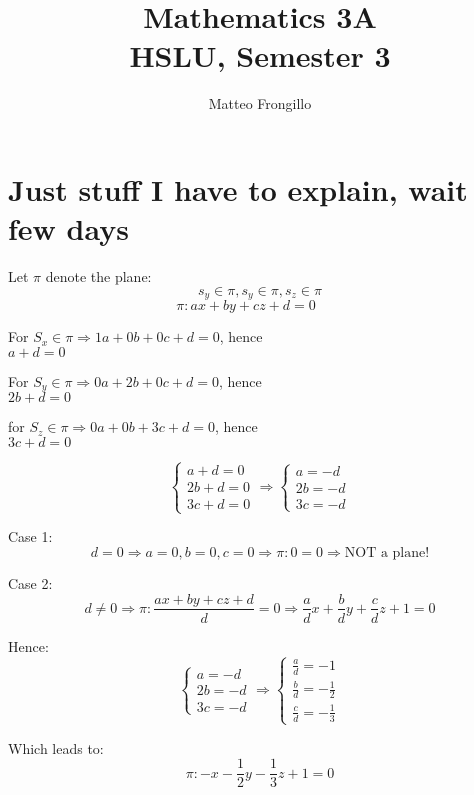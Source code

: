 \documentclass{article}
\title{\textbf{Mathematics 3A \\ HSLU, Semester 3}}
\author{Matteo Frongillo}
\date{}
\begin{document}
\maketitle
\tableofcontents
\pagebreak

\part{Just stuff I have to explain, wait few days}
Let $\pi$ denote the plane:
\[s_y\in \pi, s_y\in\pi, s_z\in\pi\]
\[\pi: ax+by+cz+d=0\qquad \]

For $S_x\in\pi \Longrightarrow 1a+0b+0c+d = 0$, hence\\
$a+d=0$

For $S_y\in\pi \Longrightarrow 0a+2b+0c+d=0$, hence\\
$2b+d=0$

for $S_z\in\pi \Longrightarrow 0a+0b+3c+d=0$, hence\\
$3c+d=0$

\[
\begin{cases}
    a+d=0\\
    2b+d=0\\
    3c+d=0
\end{cases}
\Longrightarrow
\begin{cases}
    a=-d\\
    2b=-d\\
    3c=-d
\end{cases}
\]

Case 1:
\[d=0 \Longrightarrow a=0, b=0, c=0 \Longrightarrow \pi: 0=0 \Longrightarrow \text{NOT a plane!}\]

Case 2:
\[d\neq0 \Longrightarrow \pi:\frac{ax+by+cz+d}{d} = 0 \Longrightarrow \frac{a}{d}x + \frac{b}{d}y + \frac{c}{d}z + 1 = 0\]

Hence:
\[
\begin{cases}
    a=-d\\
    2b=-d\\
    3c=-d
\end{cases}
\Longrightarrow
\begin{cases}
    \frac{a}{d} = -1\\
    \frac{b}{d} = -\frac{1}{2}\\
    \frac{c}{d} = -\frac{1}{3}
\end{cases}
\]

Which leads to:
\[\pi: -x-\frac{1}{2}y-\frac{1}{3}z + 1 = 0\]

\end{document}
